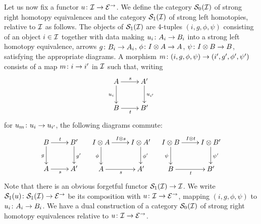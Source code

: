 \documentclass[reqno,10pt,a4paper,oneside,draft]{amsart}
\begin{document}
Let us now fix a functor $u \co \cal{I} \to \catE^\to$.
We define the category $\cal{S}_0(\cal{I})$ of strong right homotopy equivalences and the category $\cal{S}_1(\cal{I})$ of strong left homotopies, relative to $\cal{I}$ as follows.
The objects of $\cal{S}_1(\cal{I})$ are 4-tuples $(i, g,\phi,\psi)$ consisting of an object $i \in \cal{I}$ together with data making $u_i \co A_i \to B_i$ into a strong left homotopy equivalence,
\ie arrows $g \co B_i \to A_i$, $\phi \co \interval \otimes A \to A$, $\psi \co \interval \otimes B \to B$, satisfying the appropriate diagrams.
A morphism $m \co (i,g, \phi, \psi) \to (i', g', \phi', \psi')$ consists of a map $m \co i \to i'$ in $\cal{I}$ such that, writing
\[
\xymatrix{
  A \ar[d]_{u_i} \ar[r]^s & A' \ar[d]^{u_{i'}} \\
  B \ar[r]_t & B'
}
\]
for $u_m \co u_i \to u_{i'}$, the following diagrams commute:
\begin{align*}
\xymatrix{
  B
  \ar[r]^{t}
  \ar[d]_{g}
&
  B'
  \ar[d]^{g'}
\\
  A
  \ar[r]_{s}
&
  A'
}
&&
\xymatrix{
  \interval \otimes A
  \ar[d]_{\phi}
  \ar[r]^{\interval \otimes s}
&
  I \otimes A'
  \ar[d]^{\phi'}
\\
  A
  \ar[r]_{s}
&
  A'
}
&&
\xymatrix{
  \interval \otimes B
  \ar[d]_{\psi}
  \ar[r]^{\interval \otimes t}
&
  I \otimes B'
  \ar[d]^{\psi'}
\\
  B
  \ar[r]_{t}
&
  B'
}
\end{align*}
Note that there is an obvious forgetful functor $\cal{S}_1(\cal{I}) \to \cal{I}$.
We write $\cal{S}_1(u) \co \cal{S}_1(\cal{I}) \to \catE^\to$ be its composition with $u \co \cal{I} \to \catE^\to$, mapping $(i, g,\phi,\psi)$ to $u_i \co A_i \to B_i$.
We have a dual construction of a category $\cal{S}_0(\cal{I})$ of strong right homotopy equivalences relative to $u \co \cal{I} \to \catE^\to$.

\medskip
\end{document}
